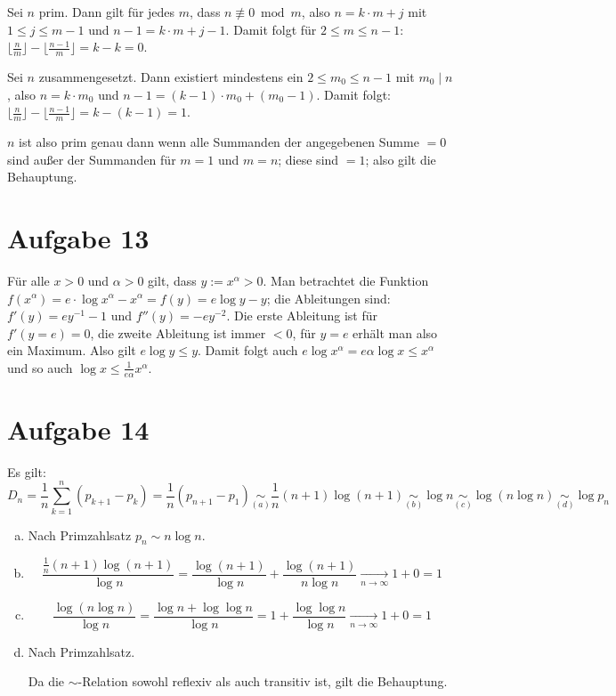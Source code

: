 Sei $n$ prim. Dann gilt für jedes $m$, dass $n  \not\equiv 0 \bmod m $, also $n = k \cdot m + j$ mit $1 \leq j \leq m-1$ und $n-1 = k \cdot m + j - 1$.
Damit folgt für $2 \leq m \leq n-1$: $ \lfloor \frac{n}{m} \rfloor - \lfloor \frac{n-1}{m} \rfloor = k - k = 0$.

Sei $n$ zusammengesetzt. Dann existiert mindestens ein $2 \leq m_0 \leq n-1 $ mit $m_0 \mid n$, also $ n = k \cdot m_0 $ und $ n-1 = (k-1) \cdot m_0 + (m_0 - 1) $.
Damit folgt: $ \lfloor \frac{n}{m} \rfloor - \lfloor \frac{n-1}{m} \rfloor = k - (k-1) = 1 $.

$n$ ist also prim genau dann wenn alle Summanden der angegebenen Summe $= 0$ sind außer der Summanden für $m=1$ und $m= n$; diese sind $=1$; also gilt die Behauptung.

\section*{Aufgabe 13}
Für alle $x > 0$ und $\alpha > 0$ gilt, dass $ y := x^\alpha > 0$.
Man betrachtet die Funktion $f(x^\alpha) = e \cdot \log x^\alpha - x^\alpha = f(y) = e \log y - y$; die Ableitungen sind:
$f'( y ) = e y^{-1} -1$ und $f''(y) = -e y^{-2} $. Die erste Ableitung ist für $f'(y = e) = 0$, die zweite Ableitung ist immer $< 0$, für $y = e$ erhält man also ein Maximum.
Also gilt $e\log y \leq y$. Damit folgt auch $e \log x^\alpha = e \alpha \log x \leq x^\alpha $ und so auch $ \log x \leq \frac{1}{e \alpha} x^\alpha$.



\section*{Aufgabe 14}
Es gilt:
\[ D_n = \frac{1}{n}\sum_{k=1}^{n} ( p_{k+1} - p_k)  = \frac{1}{n} (p_{n+1} - p_1) \underset{(a)}{\sim} \frac{1}{n} (n+1) \log (n+1) \underset{(b)}{\sim} \log n \underset{(c)}{\sim} \log (n \log n) \underset{(d)}{\sim} \log p_n  \]
\begin{enumerate}[(a)]

\item Nach Primzahlsatz $  p_n \sim n \log n  $.

\item 
\[   \frac{\frac{1}{n} (n+1) \log (n+1)}{\log n} = \frac{\log (n+1)}{\log n} + \frac{\log (n+1)} {n \log n} \underset{n \rightarrow \infty}{\rightarrow} 1 + 0 = 1\]

\item 
\[   \frac{\log (n \log n)}{\log n} = \frac{\log n + \log \log n}{ \log n} = 1 + \frac{ \log \log n}{\log n} \underset{n \rightarrow \infty}{\rightarrow} 1 + 0 = 1 \]

\item Nach Primzahlsatz.

Da die $\sim$-Relation sowohl reflexiv als auch transitiv ist, gilt die Behauptung.
\end{enumerate}

